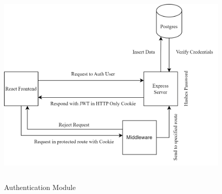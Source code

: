 \begin{figure}[H]
   \centering
    \includegraphics[height = 10cm]{Diagrams/auth module.png}
    \caption{Authentication Module}
\end{figure}

